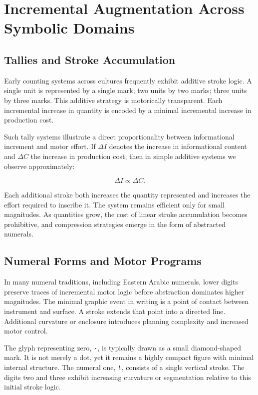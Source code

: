 \documentclass[11pt]{article}
\begin{document}
\section{Incremental Augmentation Across Symbolic Domains}

\subsection{Tallies and Stroke Accumulation}

Early counting systems across cultures frequently exhibit additive stroke logic. A single unit is represented by a single mark; two units by two marks; three units by three marks. This additive strategy is motorically transparent. Each incremental increase in quantity is encoded by a minimal incremental increase in production cost.

Such tally systems illustrate a direct proportionality between informational increment and motor effort. If $\Delta I$ denotes the increase in informational content and $\Delta C$ the increase in production cost, then in simple additive systems we observe approximately:

\[
\Delta I \propto \Delta C.
\]

Each additional stroke both increases the quantity represented and increases the effort required to inscribe it. The system remains efficient only for small magnitudes. As quantities grow, the cost of linear stroke accumulation becomes prohibitive, and compression strategies emerge in the form of abstracted numerals.

\subsection{Numeral Forms and Motor Programs}

In many numeral traditions, including Eastern Arabic numerals, lower digits preserve traces of incremental motor logic before abstraction dominates higher magnitudes. The minimal graphic event in writing is a point of contact between instrument and surface. A stroke extends that point into a directed line. Additional curvature or enclosure introduces planning complexity and increased motor control.

The glyph representing zero, \textarabic{٠}, is typically drawn as a small diamond-shaped mark. It is not merely a dot, yet it remains a highly compact figure with minimal internal structure. The numeral one, \textarabic{١}, consists of a single vertical stroke. The digits two and three exhibit increasing curvature or segmentation relative to this initial stroke logic.
\end{document}
